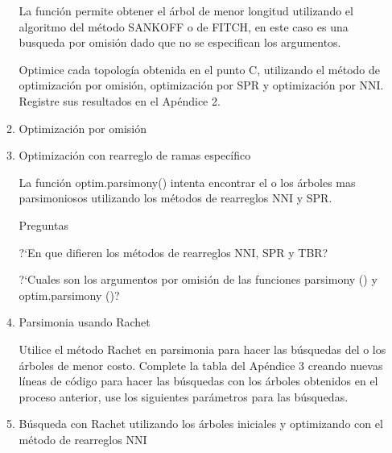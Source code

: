 \begin{itemize}
\begin{enumerate}
La funci\'on  permite obtener el \'arbol de menor longitud utilizando el algoritmo del m\'etodo SANKOFF o de FITCH,  en este caso es una busqueda por omisi\'on dado que no se especifican los argumentos.
 

Optimice cada topolog\'ia obtenida en el punto C,  utilizando el m\'etodo de optimización por omisión,  optimización por SPR y optimización por NNI. Registre sus resultados en el Ap\'endice 2.

\item Optimización por omisión








\item Optimización con rearreglo de ramas espec\'ifico






La funci\'on optim.parsimony() intenta encontrar el o los \'arboles mas parsimoniosos utilizando los m\'etodos de rearreglos NNI y SPR.


{Preguntas}

?`En que difieren los m\'etodos de rearreglos NNI,  SPR y TBR?

?`Cuales  son los argumentos por omisi\'on de las funciones parsimony () y optim.parsimony ()?\\

\item{Parsimonia usando Rachet} 



Utilice el m\'etodo Rachet en parsimonia para hacer las b\'usquedas del o los \'arboles de menor costo. Complete la tabla del Ap\'endice 3 creando nuevas l\'ineas de c\'odigo para hacer las b\'usquedas con los \'arboles obtenidos en el proceso anterior,  use los siguientes par\'ametros para las  b\'usquedas.

\item B\'usqueda con Rachet utilizando los \'arboles iniciales y optimizando con el m\'etodo de rearreglos NNI



\end{enumerate}
\end{itemize}
